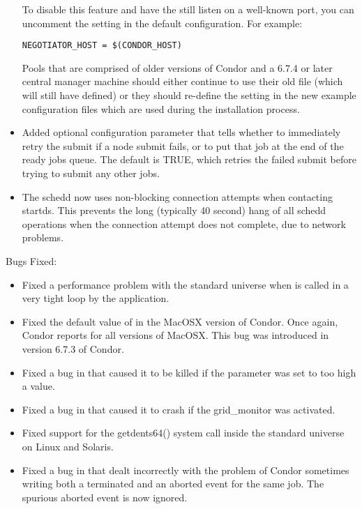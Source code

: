 \begin{itemize}
  To disable this feature and have the  still
  listen on a well-known port, you can uncomment the
   setting in the default configuration. 
  For example:
\begin{verbatim}
NEGOTIATOR_HOST = $(CONDOR_HOST)
\end{verbatim}

  Pools that are comprised of older versions of Condor and a 6.7.4 or
  later central manager machine should either continue to use their
  old  file (which will still have
   defined) or they should re-define the
   setting in the new example configuration
  files which are used during the installation process.

\item Added optional  configuration
parameter that tells  whether to immediately retry
the submit if a node submit fails, or to put that job at the end of
the ready jobs queue.  The default is TRUE, which retries the failed
submit before trying to submit any other jobs.

\item The schedd now uses non-blocking connection attempts when contacting
startds.  This prevents the long (typically 40 second) hang of all schedd
operations when the connection attempt does not complete, due to
network problems.

\end{itemize}

\noindent Bugs Fixed:

\begin{itemize}

\item Fixed a performance problem with the standard universe when
 is called in a very tight loop by the application.

\item Fixed the default value of  in the MacOSX version
  of Condor.
  Once again, Condor reports \verb@OSX@ for all versions of MacOSX.
  This bug was introduced in version 6.7.3 of Condor.

\item Fixed a bug in  that caused it to be killed if
the  parameter was set to too
high a value.

\item Fixed a bug in  that caused it to crash if
the grid\_monitor was activated.

\item Fixed support for the getdents64() system call inside the
  standard universe on Linux and Solaris.

\item Fixed a bug in  that dealt
incorrectly with the problem of Condor sometimes writing both a
terminated and an aborted event for the same job. The spurious
aborted event is now ignored.

\end{itemize}

